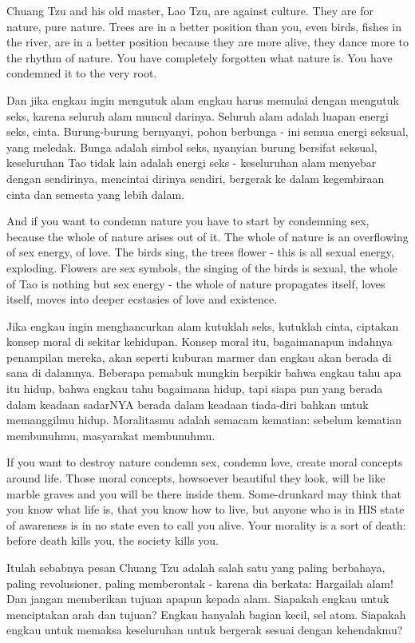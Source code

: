 \english
Chuang Tzu and his old master, Lao Tzu, are against culture. They are for nature, pure nature. Trees are in a better position than you, even birds, fishes in the river, are in a better position because they are more alive, they dance more to the rhythm of nature. You have completely forgotten what nature is. You have condemned it to the very root.

\bahasa
Dan jika engkau ingin mengutuk alam engkau harus memulai dengan mengutuk seks, karena seluruh alam muncul darinya. Seluruh alam adalah luapan energi seks, cinta. Burung-burung bernyanyi, pohon berbunga - ini semua energi seksual, yang meledak. Bunga adalah simbol seks, nyanyian burung bersifat seksual, keseluruhan Tao tidak lain adalah energi seks - keseluruhan alam menyebar dengan sendirinya, mencintai dirinya sendiri, bergerak ke dalam kegembiraan cinta dan semesta yang lebih dalam.

\english
And if you want to condemn nature you have to start by condemning sex, because the whole of nature arises out of it. The whole of nature is an overflowing of sex energy, of love. The birds sing, the trees flower - this is all sexual energy, exploding. Flowers are sex symbols, the singing of the birds is sexual, the whole of Tao is nothing but sex energy - the whole of nature propagates itself, loves itself, moves into deeper ecstasies of love and existence.

\bahasa
Jika engkau ingin menghancurkan alam kutuklah seks, kutuklah cinta, ciptakan konsep moral di sekitar kehidupan. Konsep moral itu, bagaimanapun indahnya penampilan mereka, akan seperti kuburan marmer dan engkau akan berada di sana di dalamnya. Beberapa pemabuk mungkin berpikir bahwa engkau tahu apa itu hidup, bahwa engkau tahu bagaimana hidup, tapi siapa pun yang berada dalam keadaan sadarNYA berada dalam keadaan tiada-diri bahkan untuk memanggilmu hidup. Moralitasmu adalah semacam kematian: sebelum kematian membunuhmu, masyarakat membunuhmu.

\english
If you want to destroy nature condemn sex, condemn love, create moral concepts around life. Those moral concepts, howsoever beautiful they look, will be like marble graves and you will be there inside them. Some-drunkard may think that you know what life is, that you know how to live, but anyone who is in HIS state of awareness is in no state even to call you alive. Your morality is a sort of death: before death kills you, the society kills you.

\bahasa
Itulah sebabnya pesan Chuang Tzu adalah salah satu yang paling berbahaya, paling revolusioner, paling memberontak - karena dia berkata: Hargailah alam! Dan jangan memberikan tujuan apapun kepada alam. Siapakah engkau untuk menciptakan arah dan tujuan? Engkau hanyalah bagian kecil, sel atom. Siapakah engkau untuk memaksa keseluruhan untuk bergerak sesuai dengan kehendakmu?

